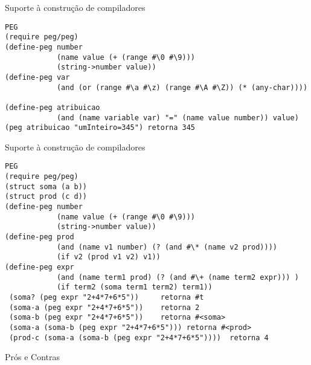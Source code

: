 \documentclass{beamer}
\begin{document}


\begin{frame}[fragile]{Suporte à construção de compiladores}
\begin{verbatim}
PEG
(require peg/peg)
(define-peg number
            (name value (+ (range #\0 #\9)))
            (string->number value))
(define-peg var
            (and (or (range #\a #\z) (range #\A #\Z)) (* (any-char))))

(define-peg atribuicao
            (and (name variable var) "=" (name value number)) value)
(peg atribuicao "umInteiro=345") retorna 345
\end{verbatim}
\end{frame}



\begin{frame}[fragile]{Suporte à construção de compiladores}
\begin{verbatim}
PEG
(require peg/peg)
(struct soma (a b))
(struct prod (c d))
(define-peg number
            (name value (+ (range #\0 #\9)))
            (string->number value))
(define-peg prod
            (and (name v1 number) (? (and #\* (name v2 prod))))
            (if v2 (prod v1 v2) v1))
(define-peg expr
            (and (name term1 prod) (? (and #\+ (name term2 expr))) )
            (if term2 (soma term1 term2) term1))
 (soma? (peg expr "2+4*7+6*5"))     retorna #t
 (soma-a (peg expr "2+4*7+6*5"))    retorna 2
 (soma-b (peg expr "2+4*7+6*5"))    retorna #<soma>
 (soma-a (soma-b (peg expr "2+4*7+6*5"))) retorna #<prod>
 (prod-c (soma-a (soma-b (peg expr "2+4*7+6*5"))))  retorna 4
\end{verbatim}
\end{frame}


\begin{frame}{Prós e Contras}

\end{frame}
\end{document}
